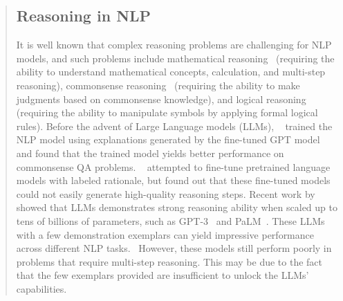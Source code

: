 \documentclass[11pt]{article}
\begin{document}
\begin{abstract}
\subsection{Reasoning in NLP}
It is well known that complex reasoning problems are challenging for NLP models, and such problems include mathematical reasoning~\citep{gsm8k, svamp, aqua, mawps} (requiring the ability to understand mathematical concepts, calculation, and multi-step reasoning), commonsense reasoning~\citep{commonsenseqa, strategyqa} (requiring the ability to make judgments based on commonsense knowledge), and logical reasoning~\cite{cot_wei} (requiring the ability to manipulate symbols by applying formal logical rules).
Before the advent of Large Language models (LLMs), ~\citet{commonsenseqa} trained the NLP model using explanations generated by the fine-tuned GPT model and found that the trained model yields better performance on commonsense QA problems.
~\citet{hendrycks2021measuring} attempted to fine-tune pretrained language models with labeled rationale, but found out that these fine-tuned models could not easily generate high-quality reasoning steps.
Recent work by \citet{wei2022emergent} showed that LLMs demonstrates strong reasoning ability when scaled up to tens of billions of parameters, such as GPT-3~\citep{brown2020language} and PaLM~\citep{palm}.
These LLMs
with a few demonstration exemplars can yield impressive performance across different NLP tasks. 
However, these models still perform poorly in problems that require multi-step reasoning.
This may be due to the fact that the few exemplars provided are insufficient to unlock the LLMs' capabilities.





\end{abstract}
\end{document}
